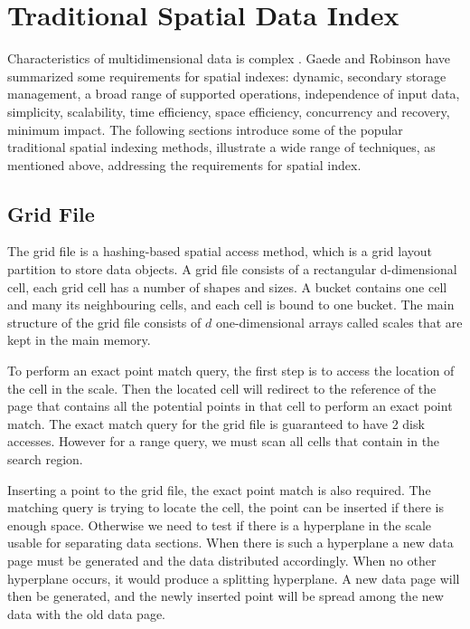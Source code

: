 \section{Traditional Spatial Data Index}

Characteristics of multidimensional data is complex  \cite{Gaede:1998fp, Robinson:1981id}. Gaede and Robinson have summarized some requirements for spatial indexes: dynamic, secondary storage management, a broad range of supported operations, independence of input data, simplicity, scalability, time efficiency, space efficiency, concurrency and recovery, minimum impact. The following sections introduce some of the popular traditional spatial indexing methods,  illustrate a wide range of techniques, as mentioned above, addressing the requirements for spatial index. 




\subsection{Grid File}
The grid file \cite{NievergeltJ:1984kc} is a hashing-based spatial access method, which is a grid layout partition to store data objects. A grid file consists of a rectangular d-dimensional cell, each grid cell has a number of shapes and sizes. A bucket contains one cell and many its neighbouring cells, and each cell is bound to one bucket. The main structure of the grid file consists of $d$ one-dimensional arrays called scales that are kept in the main memory. 


To perform an exact point match query, the first step is to access the location of the cell in the scale. Then the located cell will redirect to the reference of the page that contains all the potential points in that cell to perform an exact point match. The exact match query for the grid file is guaranteed to have 2 disk accesses. However for a range query, we must scan all cells that contain in the search region. 

Inserting a point to the grid file, the exact point match is also required. The matching query is trying to locate the cell, the point can be inserted if there is enough space. Otherwise we need to test if there is a hyperplane in the scale usable for separating data sections. When there is such a hyperplane a new data page must be generated and the data distributed accordingly. When no other hyperplane occurs, it would produce a splitting hyperplane. A new data page will then be generated, and the newly inserted point will be spread among the new data with the old data page. 


